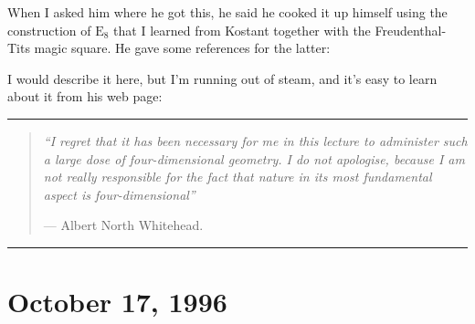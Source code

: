 \documentclass{article}
\def\tightlist{}
\renewcommand{\texttt}[1]{%
  \begingroup
  \ttfamily
  \begingroup\lccode`~=`/\lowercase{\endgroup\def~}{/\discretionary{}{}{}}%
  \begingroup\lccode`~=`[\lowercase{\endgroup\def~}{[\discretionary{}{}{}}%
  \begingroup\lccode`~=`.\lowercase{\endgroup\def~}{.\discretionary{}{}{}}%
  \catcode`/=\active\catcode`[=\active\catcode`.=\active
  \scantokens{#1\noexpand}%
  \endgroup
}
\begin{document}
When I asked him where he got this, he said he cooked it up himself
using the construction of \(\mathrm{E}_8\) that I learned from Kostant
together with the Freudenthal-Tits magic square. He gave some references
for the latter:


I would describe it here, but I'm running out of steam, and it's easy to
learn about it from his web page:


\begin{center}\rule{0.5\linewidth}{0.5pt}\end{center}

\begin{quote}
\emph{``I regret that it has been necessary for me in this lecture to
administer such a large dose of four-dimensional geometry. I do not
apologise, because I am not really responsible for the fact that nature
in its most fundamental aspect is four-dimensional''}

--- Albert North Whitehead.
\end{quote}

\begin{center}\rule{0.5\linewidth}{0.5pt}\end{center}



\hypertarget{week92}{%
\section{October 17, 1996}\label{week92}}
\end{document}
